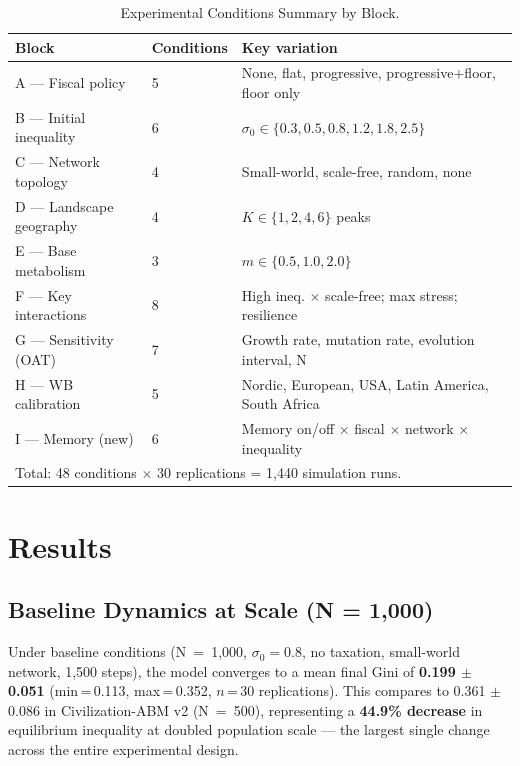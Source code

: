 \documentclass[12pt, letterpaper]{article}
\begin{document}
\begin{table}[h]
\centering
\caption{Experimental Conditions Summary by Block.}
\label{tab:conditions}
\small
\begin{tabular}{llp{7cm}}
\toprule
Block & Conditions & Key variation \\
\midrule
A --- Fiscal policy      & 5 & None, flat, progressive, progressive+floor, floor only \\
B --- Initial inequality & 6 & $\sigma_0 \in \{0.3, 0.5, 0.8, 1.2, 1.8, 2.5\}$ \\
C --- Network topology   & 4 & Small-world, scale-free, random, none \\
D --- Landscape geography& 4 & $K \in \{1, 2, 4, 6\}$ peaks \\
E --- Base metabolism    & 3 & $m \in \{0.5, 1.0, 2.0\}$ \\
F --- Key interactions   & 8 & High ineq. $\times$ scale-free; max stress; resilience \\
G --- Sensitivity (OAT)  & 7 & Growth rate, mutation rate, evolution interval, N \\
H --- WB calibration     & 5 & Nordic, European, USA, Latin America, South Africa \\
I --- Memory (new)       & 6 & Memory on/off $\times$ fiscal $\times$ network $\times$ inequality \\
\bottomrule
\multicolumn{3}{l}{Total: 48 conditions $\times$ 30 replications = 1,440 simulation runs.}
\end{tabular}
\end{table}


\section{Results}

\subsection{Baseline Dynamics at Scale (N = 1,000)}

Under baseline conditions (N~=~1,000, $\sigma_0 = 0.8$, no taxation,
small-world network, 1,500 steps), the model converges to a mean final
Gini of \textbf{0.199 $\pm$ 0.051} (min\,=\,0.113, max\,=\,0.352,
$n$\,=\,30 replications). This compares to 0.361 $\pm$ 0.086 in
Civilization-ABM v2 (N~=~500), representing a \textbf{44.9\%
decrease} in equilibrium inequality at doubled population scale ---
the largest single change across the entire experimental design.
\end{document}
